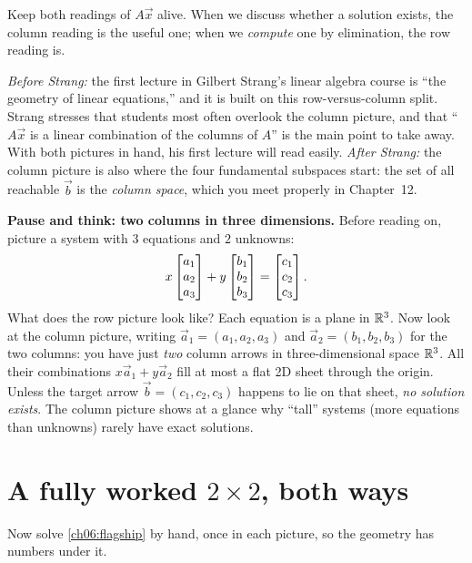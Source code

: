 Keep both readings of $A\vec x$ alive. When we discuss whether a solution
exists, the column reading is the useful one; when we \emph{compute} one by
elimination, the row reading is.

\begin{strangbox}
\emph{Before Strang:} the first lecture in Gilbert Strang's linear algebra
course is ``the geometry of linear equations,'' and it is built on this
row-versus-column split. Strang stresses that students most often overlook
the column picture, and that ``$A\vec x$ is a linear combination of the
columns of $A$'' is the main point to take away. With both pictures in hand,
his first lecture will read easily.
\emph{After Strang:} the column picture is also where the four fundamental
subspaces start: the set of all reachable $\vec b$ is the \emph{column
space}, which you meet properly in Chapter~12.
\end{strangbox}

\begin{recoverybox}
\textbf{Pause and think: two columns in three dimensions.}
Before reading on, picture a system with $3$ equations and $2$ unknowns:
\[
  x\begin{bmatrix}a_1\\a_2\\a_3\end{bmatrix} + y\begin{bmatrix}b_1\\b_2\\b_3\end{bmatrix} = \begin{bmatrix}c_1\\c_2\\c_3\end{bmatrix}.
\]
What does the row picture look like? Each equation is a plane in $\mathbb{R}^3$.
Now look at the column picture, writing $\vec a_1=(a_1,a_2,a_3)$ and
$\vec a_2=(b_1,b_2,b_3)$ for the two columns: you have just \emph{two} column
arrows in three-dimensional space $\mathbb{R}^3$. All their combinations
$x\vec{a}_1 + y\vec{a}_2$ fill at most a flat 2D sheet through the origin.
Unless the target arrow $\vec b=(c_1,c_2,c_3)$ happens to lie on that sheet,
\emph{no solution exists}. The column picture shows at a glance why
``tall'' systems (more equations than unknowns) rarely have exact solutions.
\end{recoverybox}

\section{A fully worked $2\times 2$, both ways}

Now solve \eqref{ch06:flagship} by hand, once in each picture, so the
geometry has numbers under it.

